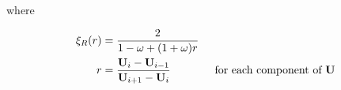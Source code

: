 where

\begin{align}
\xi_R(r) &=
	\frac{2}{1 - \omega + (1 + \omega) r}
\\
r &=
	\frac{\mathbf{U}_i - \mathbf{U}_{i-1}}{\mathbf{U}_{i+1} - \mathbf{U}_{i}}
	\quad\quad\quad\quad \text{for each component of }\mathbf{U}
\end{align}




